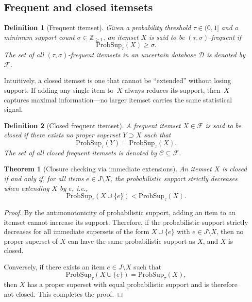 \documentclass[10pt,letterpaper]{article}
\newtheorem{definition}{Definition}[section]
\newtheorem{theorem}{Theorem}
\newcounter{definition}
\begin{document}
\subsection*{Frequent and closed itemsets}
\label{subsec:freq_closed}

\begin{definition}[Frequent itemset]
\label{def:frequent}
Given a probability threshold $\tau \in (0,1]$ and a minimum support count $\sigma \in \mathbb{Z}_{\geq 1}$, an itemset $X$ is said to be $(\tau,\sigma)$-frequent if
\begin{equation}
\mathrm{ProbSup}_{\tau}(X) \geq \sigma .
\label{eq:freq_def}
\end{equation}
The set of all $(\tau,\sigma)$-frequent itemsets in an uncertain database $\mathcal{D}$ is denoted by $\mathcal{F}$.
\end{definition}

Intuitively, a closed itemset is one that cannot be ``extended'' without losing
support. If adding any single item to~$X$ always reduces its support, then~$X$
captures maximal information---no larger itemset carries the same statistical
signal.

\begin{definition}[Closed frequent itemset]
\label{def:closed}
A frequent itemset $X \in \mathcal{F}$ is said to be \emph{closed} if there exists no proper superset $Y \supset X$ such that
\begin{equation}
\mathrm{ProbSup}_{\tau}(Y) = \mathrm{ProbSup}_{\tau}(X).
\label{eq:closed_def}
\end{equation}
The set of all closed frequent itemsets is denoted by $\mathcal{C} \subseteq \mathcal{F}$.
\end{definition}

\begin{theorem}[Closure checking via immediate extensions]
\label{thm:closure_immediate}
An itemset $X$ is closed if and only if, for all items $e \in J \setminus X$, the probabilistic support strictly decreases when extending $X$ by $e$, i.e.,
\begin{equation}
\mathrm{ProbSup}_{\tau}(X \cup \{e\}) < \mathrm{ProbSup}_{\tau}(X).
\label{eq:closure_check}
\end{equation}
\end{theorem}

\begin{proof}
By the antimonotonicity of probabilistic support, adding an item to an itemset cannot increase its support. Therefore, if the probabilistic support strictly decreases for all immediate supersets of the form $X \cup \{e\}$ with $e \in J \setminus X$, then no proper superset of $X$ can have the same probabilistic support as $X$, and $X$ is closed.

Conversely, if there exists an item $e \in J \setminus X$ such that
\[
\mathrm{ProbSup}_{\tau}(X \cup \{e\}) = \mathrm{ProbSup}_{\tau}(X),
\]
then $X$ has a proper superset with equal probabilistic support and is therefore not closed. This completes the proof.
\end{proof}
\end{document}
